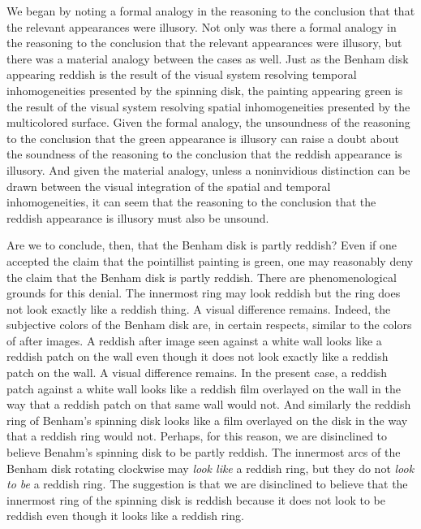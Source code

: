 \documentclass[12pt]{article}
\begin{document}
We began by noting a formal analogy in the reasoning to the conclusion that that the relevant appearances were illusory. Not only was there a formal analogy in the reasoning to the conclusion that the relevant appearances were illusory, but there was a material analogy between the cases as well. Just as the Benham disk appearing reddish is the result of the visual system resolving temporal inhomogeneities presented by the spinning disk, the painting appearing green is the result of the visual system resolving spatial inhomogeneities presented by the multicolored surface. Given the formal analogy, the unsoundness of the reasoning to the conclusion that the green appearance is illusory can raise a doubt about the soundness of the reasoning to the conclusion that the reddish appearance is illusory. And given the material analogy, unless a noninvidious distinction can be drawn between the visual integration of the spatial and temporal inhomogeneities, it can seem that the reasoning to the conclusion that the reddish appearance is illusory must also be unsound. 

Are we to conclude, then, that the Benham disk is partly reddish? Even if one accepted the claim that the pointillist painting is green, one may reasonably deny the claim that the Benham disk is partly reddish. There are phenomenological grounds for this denial. The innermost ring may look reddish but the ring does not look exactly like a reddish thing. A visual difference remains. Indeed, the subjective colors of the Benham disk are, in certain respects, similar to the colors of after images. A reddish after image seen against a white wall looks like a reddish patch on the wall even though it does not look exactly like a reddish patch on the wall. A visual difference remains. %
In the present case, a reddish patch against a white wall looks like a reddish film overlayed on the wall in the way that a reddish patch on that same wall would not. And similarly the reddish ring of Benham's spinning disk looks like a film overlayed on the disk in the way that a reddish ring would not. Perhaps, for this reason, we are disinclined to believe Benahm's spinning disk to be partly reddish. The innermost arcs of the Benham disk rotating clockwise may \emph{look like} a reddish ring, but they do not \emph{look to be} a reddish ring. The suggestion is that we are disinclined to believe that the innermost ring of the spinning disk is reddish because it does not look to be reddish even though it looks like a reddish ring.
\end{document}

